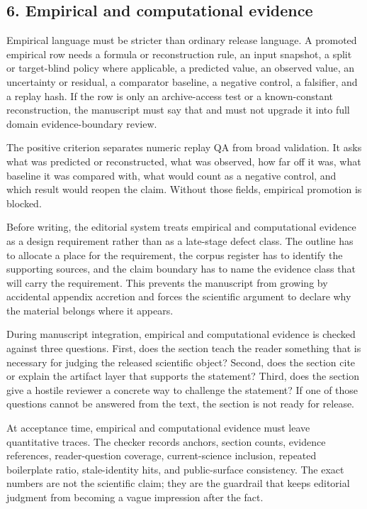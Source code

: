 \subsection{6. Empirical and computational evidence}

Empirical language must be stricter than ordinary release language. A promoted empirical row needs a formula or reconstruction rule, an input snapshot, a split or target-blind policy where applicable, a predicted value, an observed value, an uncertainty or residual, a comparator baseline, a negative control, a falsifier, and a replay hash. If the row is only an archive-access test or a known-constant reconstruction, the manuscript must say that and must not upgrade it into full domain evidence-boundary review.


The positive criterion separates numeric replay QA from broad validation. It asks what was predicted or reconstructed, what was observed, how far off it was, what baseline it was compared with, what would count as a negative control, and which result would reopen the claim. Without those fields, empirical promotion is blocked.


Before writing, the editorial system treats empirical and computational evidence as a design requirement rather than as a late-stage defect class. The outline has to allocate a place for the requirement, the corpus register has to identify the supporting sources, and the claim boundary has to name the evidence class that will carry the requirement. This prevents the manuscript from growing by accidental appendix accretion and forces the scientific argument to declare why the material belongs where it appears.


During manuscript integration, empirical and computational evidence is checked against three questions. First, does the section teach the reader something that is necessary for judging the released scientific object? Second, does the section cite or explain the artifact layer that supports the statement? Third, does the section give a hostile reviewer a concrete way to challenge the statement? If one of those questions cannot be answered from the text, the section is not ready for release.


At acceptance time, empirical and computational evidence must leave quantitative traces. The checker records anchors, section counts, evidence references, reader-question coverage, current-science inclusion, repeated boilerplate ratio, stale-identity hits, and public-surface consistency. The exact numbers are not the scientific claim; they are the guardrail that keeps editorial judgment from becoming a vague impression after the fact.


